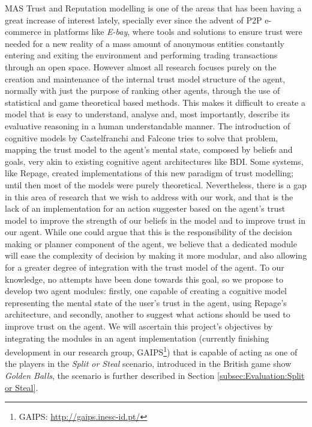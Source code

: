 \ac{MAS} Trust and Reputation modelling is one of the areas that has been having a great increase of interest lately, specially ever since the advent of \ac{P2P} e-commerce in platforms like \textit{E-bay}\cite{eBay2002}, where tools and solutions to ensure trust were needed for a new reality of a mass amount of anonymous entities constantly entering and exiting the environment and performing trading transactions through an open space. However almost all research focuses purely on the creation and maintenance of the internal trust model structure of the agent, normally with just the purpose of ranking other agents, through the use of statistical and game theoretical based methods. This makes it difficult to create a model that is easy to understand, analyse and, most importantly, describe its evaluative reasoning in a human understandable manner. The introduction of cognitive models by Castelfranchi and Falcone \cite{Castelfranchi1998} tries to solve that problem, mapping the trust model to the agent's mental state, composed by beliefs and goals, very akin to existing cognitive agent architectures like BDI\cite{Rao1995}. Some systems, like Repage\cite{Sabater2006}, created implementations of this new paradigm of trust modelling; until then most of the models were purely theoretical. Nevertheless, there is a gap in this area of research that we wish to address with our work, and that is the lack of an implementation for an action suggester based on the agent's trust model to improve the strength of our beliefs in the model and to improve trust in our agent. While one could argue that this is the responsibility of the decision making or planner component of the agent, we believe that a dedicated module will ease the complexity of decision by making it more modular, and also allowing for a greater degree of integration with the trust model of the agent. To our knowledge, no attempts have been done towards this goal, so we propose to develop two agent modules: firstly, one capable of creating a cognitive model representing the mental state of the user's trust in the agent, using Repage's architecture, and secondly, another to suggest what actions should be used to improve trust on the agent. We will ascertain this project's objectives by integrating the modules in an agent implementation (currently finishing development in our research group, \acs{GAIPS}\footnote{\ac{GAIPS}: \url{http://gaips.inesc-id.pt/}}) that is capable of acting as one of the players in the \textit{Split or Steal} scenario, introduced in the British game show \textit{Golden Balls}\cite{Wikipedia.Golden.Balls}, the scenario is further described in Section \ref{subsec:Evaluation:Split or Steal}. 

